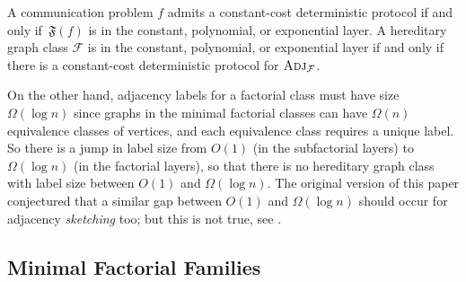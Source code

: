 \documentclass{article}
\newcommand{\cF}{\ensuremath{\mathcal{F}}}
\newcommand{\Adj}{\textsc{Adj}}
\begin{document}
\begin{proposition}
A communication problem $f$ admits a constant-cost deterministic protocol if and only if $\,\mathfrak{F}(f)$ is in the constant, polynomial, or exponential layer. A hereditary graph class
$\cF$ is in the constant, polynomial, or exponential layer if and only if there is a constant-cost
deterministic protocol for $\Adj_\cF$.
\end{proposition}

On the other hand, adjacency labels for a factorial class must have size $\Omega(\log n)$ since
graphs in the minimal factorial classes can have $\Omega(n)$ equivalence classes of vertices, and
each equivalence class requires a unique label. So there is a jump in label size from $O(1)$ (in the
subfactorial layers) to $\Omega(\log n)$ (in the factorial layers), so that there is no hereditary
graph class with label size between $O(1)$ and $\Omega(\log n)$. The original version of this paper
conjectured that a similar gap between $O(1)$ and $\Omega(\log n)$ should occur for adjacency
\emph{sketching} too; but this is not true, see \cite{HHH22counter}. 

\subsection{Minimal Factorial Families}
\label{section:appendix-minimal-families}
\end{document}
